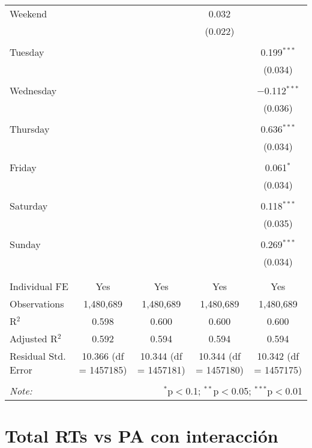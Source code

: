 \documentclass[
]{article}
\begin{document}
\begin{table}[!htbp]
{\begin{tabular}{@{\extracolsep{5pt}}lcccc}
 Weekend &  &  & 0.032 &  \\ 
  &  &  & (0.022) &  \\ 
  & & & & \\ 
 Tuesday &  &  &  & 0.199$^{***}$ \\ 
  &  &  &  & (0.034) \\ 
  & & & & \\ 
 Wednesday &  &  &  & $-$0.112$^{***}$ \\ 
  &  &  &  & (0.036) \\ 
  & & & & \\ 
 Thursday &  &  &  & 0.636$^{***}$ \\ 
  &  &  &  & (0.034) \\ 
  & & & & \\ 
 Friday &  &  &  & 0.061$^{*}$ \\ 
  &  &  &  & (0.034) \\ 
  & & & & \\ 
 Saturday &  &  &  & 0.118$^{***}$ \\ 
  &  &  &  & (0.035) \\ 
  & & & & \\ 
 Sunday &  &  &  & 0.269$^{***}$ \\ 
  &  &  &  & (0.034) \\ 
  & & & & \\ 
\hline \\[-1.8ex] 
Individual FE & Yes & Yes & Yes & Yes \\ 
Observations & 1,480,689 & 1,480,689 & 1,480,689 & 1,480,689 \\ 
R$^{2}$ & 0.598 & 0.600 & 0.600 & 0.600 \\ 
Adjusted R$^{2}$ & 0.592 & 0.594 & 0.594 & 0.594 \\ 
Residual Std. Error & 10.366 (df = 1457185) & 10.344 (df = 1457181) & 10.344 (df = 1457180) & 10.342 (df = 1457175) \\ 
\hline 
\hline \\[-1.8ex] 
\textit{Note:}  & \multicolumn{4}{r}{$^{*}$p$<$0.1; $^{**}$p$<$0.05; $^{***}$p$<$0.01} \\ 
\end{tabular}
} 
\end{table} 
\newpage
\section{Total RTs vs PA con interacción}
\end{document}
